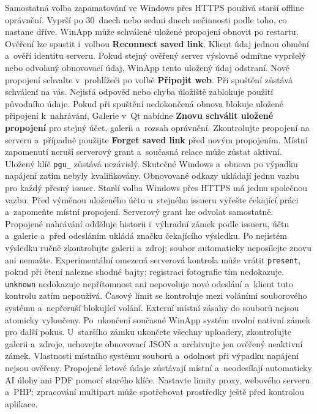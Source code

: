 \documentclass[11pt,a4paper]{article}
\newcommand{\ui}[1]{\textbf{#1}}
\begin{document}
Samostatná volba zapamatování ve Windows přes HTTPS používá starší offline
oprávnění. Vyprší po 30~dnech nebo sedmi dnech nečinnosti podle toho, co
nastane dříve. WinApp může schválené uložené propojení obnovit po restartu.
Ověření lze spustit i~volbou \ui{Reconnect saved link}.
Klient údaj jednou obmění a~ověří identitu serveru. Pokud stejný ověřený
server výslovně odmítne vypršelý nebo odvolaný obnovovací údaj, WinApp tento
uložený údaj odstraní. Nové propojení schvalte v~prohlížeči po volbě
\ui{Připojit web}. Při spuštění zůstává schválení na vás. Nejistá odpověď
nebo chyba úložiště zablokuje použití původního údaje. Pokud při spuštění
nedokončená obnova blokuje uložené připojení k~nahrávání, Galerie v~Qt nabídne
\ui{Znovu schválit uložené propojení} pro stejný účet, galerii a~rozsah
oprávnění. Zkontrolujte propojení
na serveru a~případně použijte \ui{Forget saved link} před novým propojením.
Místní zapomenutí neruší serverový grant a~současná relace může zůstat aktivní.
Uložený klíč \texttt{pgu\_} zůstává nezávislý. Skutečné Windows a~obnova po
výpadku napájení zatím nebyly kvalifikovány. Obnovované odkazy ukládají jednu
vazbu pro každý přesný issuer. Starší volba Windows přes HTTPS má jednu společnou vazbu. Před výměnou uloženého
účtu u~stejného issueru vyřešte čekající práci a~zapomeňte místní propojení.
Serverový grant lze odvolat samostatně. Propojené nahrávání odděluje
historii i~výhradní zámek podle issueru, účtu
a~galerie a~před odesláním ukládá značku čekajícího výsledku. Po nejistém
výsledku ručně zkontrolujte galerii a~zdroj; soubor automaticky neposílejte
znovu ani nemažte. Experimentální omezená serverová kontrola může vrátit
\texttt{present}, pokud při čtení nalezne shodné bajty; registraci fotografie
tím nedokazuje. \texttt{unknown} nedokazuje nepřítomnost ani nepovoluje nové
odeslání a~klient tuto kontrolu zatím nepoužívá. Časový limit se kontroluje mezi
voláními souborového systému a~nepřeruší blokující volání. Externí místní
zásahy do souborů nejsou atomicky vyloučeny. Po~ukončení současné WinApp
systém uvolní nativní zámek pro další pokus. U~staršího zámku ukončete
všechny uploadery, zkontrolujte galerii a~zdroje, uchovejte obnovovací JSON
a~archivujte jen ověřený neaktivní zámek.
Vlastnosti místního systému souborů a~odolnost při výpadku napájení nejsou
ověřeny. Propojené letové údaje zůstávají místní a~neodesílají automaticky AI
úlohy ani PDF pomocí starého klíče. Nastavte limity proxy, webového serveru
a~PHP: zpracování multipart může spotřebovat prostředky ještě před kontrolou
aplikace.
\end{document}
